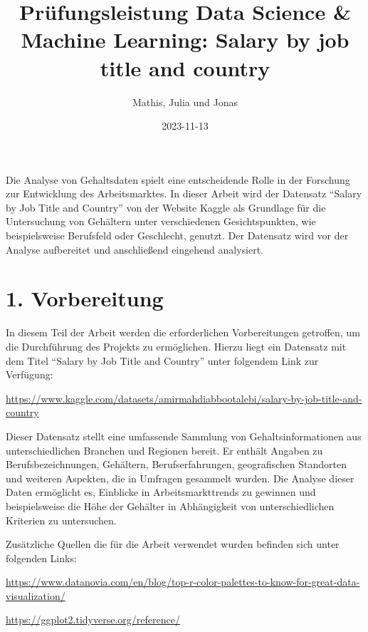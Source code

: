\documentclass[
  letterpaper,
  DIV=11,
  numbers=noendperiod]{scrartcl}
\title{Prüfungsleistung Data Science \& Machine Learning: Salary by job
title and country}
\author{Mathis, Julia und Jonas}
\date{2023-11-13}
\renewcommand*\contentsname{Table of contents}
\newcommand\contentsname{Table of contents}
\begin{document}
\maketitle
\ifdefined\Shaded\renewenvironment{Shaded}{\begin{tcolorbox}[sharp corners, borderline west={3pt}{0pt}{shadecolor}, frame hidden, breakable, enhanced, boxrule=0pt, interior hidden]}{\end{tcolorbox}}\fi

\renewcommand*\contentsname{Table of contents}
{
\hypersetup{linkcolor=}
\setcounter{tocdepth}{3}
\tableofcontents
}
Die Analyse von Gehaltsdaten spielt eine entscheidende Rolle in der
Forschung zur Entwicklung des Arbeitsmarktes. In dieser Arbeit wird der
Datensatz ``Salary by Job Title and Country'' von der Website Kaggle als
Grundlage für die Untersuchung von Gehältern unter verschiedenen
Gesichtspunkten, wie beispielsweise Berufsfeld oder Geschlecht, genutzt.
Der Datensatz wird vor der Analyse aufbereitet und anschließend
eingehend analysiert.

\hypertarget{vorbereitung}{%
\section{1. Vorbereitung}\label{vorbereitung}}

In diesem Teil der Arbeit werden die erforderlichen Vorbereitungen
getroffen, um die Durchführung des Projekts zu ermöglichen. Hierzu liegt
ein Datensatz mit dem Titel ``Salary by Job Title and Country'' unter
folgendem Link zur Verfügung:

\url{https://www.kaggle.com/datasets/amirmahdiabbootalebi/salary-by-job-title-and-country}

Dieser Datensatz stellt eine umfassende Sammlung von
Gehaltsinformationen aus unterschiedlichen Branchen und Regionen bereit.
Er enthält Angaben zu Berufsbezeichnungen, Gehältern, Berufserfahrungen,
geografischen Standorten und weiteren Aspekten, die in Umfragen
gesammelt wurden. Die Analyse dieser Daten ermöglicht es, Einblicke in
Arbeitsmarkttrends zu gewinnen und beispielsweise die Höhe der Gehälter
in Abhängigkeit von unterschiedlichen Kriterien zu untersuchen.

Zusätzliche Quellen die für die Arbeit verwendet wurden befinden sich
unter folgenden Links:

\url{https://www.datanovia.com/en/blog/top-r-color-palettes-to-know-for-great-data-visualization/}

\url{https://ggplot2.tidyverse.org/reference/}
\end{document}
